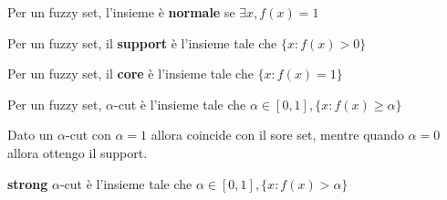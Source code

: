 \begin{definizione}
    Per un fuzzy set, l'insieme è \textbf{normale} se $\exists x, f(x) = 1$
\end{definizione}
\begin{definizione}
    Per un fuzzy set, il \textbf{support} è l'insieme tale che $\{x: f(x) >0\}$
\end{definizione}
\begin{definizione}
    Per un fuzzy set, il \textbf{core} è l'insieme tale che $\{x: f(x) =1\}$
\end{definizione}
\begin{definizione}
    Per un fuzzy set, $\alpha$-cut è l'insieme tale che $\alpha \in [0,1], \{x: f(x) \ge\alpha\}$
\end{definizione}
\begin{esempio}
    Dato un  $\alpha$-cut con $\alpha =1$ allora coincide con il sore set, mentre 
    quando $\alpha =0$ allora ottengo il support.
\end{esempio}

\begin{definizione}
    \textbf{strong} $\alpha$-cut è l'insieme tale che $\alpha \in [0,1], \{x: f(x) >\alpha\}$
\end{definizione}


